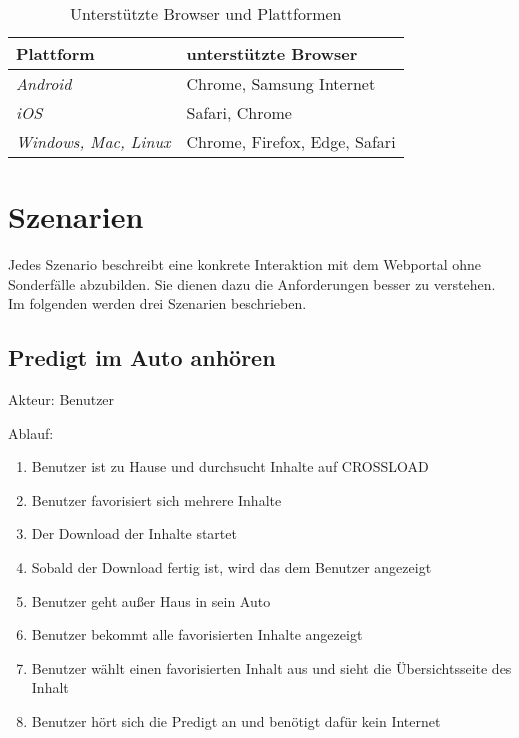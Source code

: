 \begin{table}
  \renewcommand{\arraystretch}{1.2}
  \centering
  \sffamily
  \begin{footnotesize}
    \begin{tabular}{l l}
      \toprule
      \textbf{Plattform} & \textbf{unterstützte Browser} \\
      \midrule
      \emph{Android} & Chrome, Samsung Internet \\
      \emph{iOS} & Safari, Chrome \\
      \emph{Windows, Mac, Linux} & Chrome, Firefox, Edge, Safari \\
      \bottomrule
    \end{tabular}
  \end{footnotesize}
  \rmfamily
  \caption{Unterstützte Browser und Plattformen}
  \label{Kap3:Browser}
\end{table}

\section{Szenarien}
\label{Kap3:Szenarien}
Jedes Szenario beschreibt eine konkrete Interaktion mit dem Webportal ohne Sonderfälle abzubilden. Sie dienen dazu die Anforderungen besser zu verstehen. Im folgenden werden drei Szenarien beschrieben.

\subsection{Predigt im Auto anhören}
Akteur: Benutzer

Ablauf:
\begin{enumerate}
	\item Benutzer ist zu Hause und durchsucht Inhalte auf CROSSLOAD
	\item Benutzer favorisiert sich mehrere Inhalte
	\item Der Download der Inhalte startet
	\item Sobald der Download fertig ist, wird das dem Benutzer angezeigt
	\item Benutzer geht außer Haus in sein Auto
	\item Benutzer bekommt alle favorisierten Inhalte angezeigt
	\item Benutzer wählt einen favorisierten Inhalt aus und sieht die Übersichtsseite des Inhalt
	\item Benutzer hört sich die Predigt an und benötigt dafür kein Internet
\end{enumerate}

